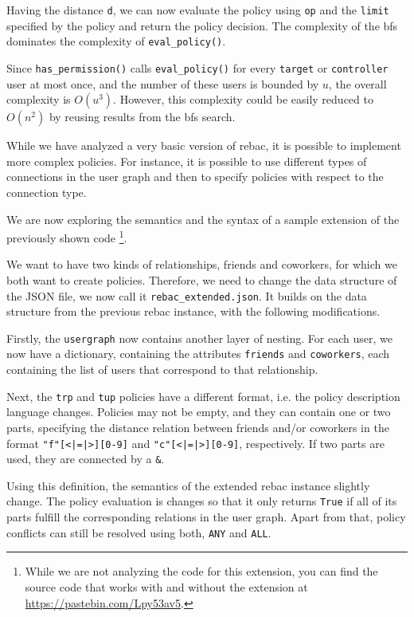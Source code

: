 \documentclass{semdoc}
\begin{document}
Having the distance \texttt{d}, we can now evaluate the policy using \texttt{op} and the \texttt{limit} specified by the policy and return the policy decision.
The complexity of the \gls{bfs} dominates the complexity of \texttt{eval\_policy()}.

Since \texttt{has\_permission()} calls \texttt{eval\_policy()} for every \texttt{target} or \texttt{controller} user at most once, and the number of these users is bounded by $u$, the overall complexity is $O(u^3)$. 
However, this complexity could be easily reduced to $O(n^2)$ by reusing results from the \gls{bfs} search.


While we have analyzed a very basic version of \gls{rebac}, it is possible to implement more complex policies.
For instance, it is possible to use different types of connections in the user graph and then to specify policies with respect to the connection type.

We are now exploring the semantics and the syntax of a sample extension of the previously shown code \footnote{While we are not analyzing the code for this extension, you can find the source code that works with and without the extension at \url{https://pastebin.com/Lpy53av5}.}.

We want to have two kinds of relationships, friends and coworkers, for which we both want to create policies. 
Therefore, we need to change the data structure of the JSON file, we now call it \texttt{rebac\_extended.json}. 
It builds on the data structure from the previous \gls{rebac} instance, with the following modifications.

Firstly, the \texttt{usergraph} now contains another layer of nesting. 
For each user, we now have a dictionary, containing the attributes \texttt{friends} and \texttt{coworkers}, each containing the list of users that correspond to that relationship.

Next, the \texttt{trp} and \texttt{tup} policies have a different format, i.e. the policy description language changes. 
Policies may not be empty, and they can contain one or two parts, specifying the distance relation between friends and/or coworkers in the format \texttt{"f"[<|=|>][0-9]} and \texttt{"c"[<|=|>][0-9]}, respectively. 
If two parts are used, they are connected by a \texttt{\&}. 

Using this definition, the semantics of the extended \gls{rebac} instance slightly change. 
The policy evaluation is changes so that it only returns \texttt{True} if all of its parts fulfill the corresponding relations in the user graph. 
Apart from that, policy conflicts can still be resolved using both, \texttt{ANY} and \texttt{ALL}.
\end{document}
